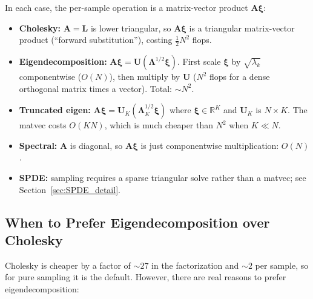 \documentclass[11pt]{article}
\newcommand{\R}{\mathbb{R}}
\newcommand{\bL}{\mathbf{L}}
\newcommand{\bU}{\mathbf{U}}
\newcommand{\bA}{\mathbf{A}}
\newcommand{\bxi}{\boldsymbol{\xi}}
\newcommand{\bLambda}{\boldsymbol{\Lambda}}
\begin{document}
\medskip
In each case, the per-sample operation is a matrix-vector product $\bA\bxi$:
\begin{itemize}[nosep]
  \item \textbf{Cholesky:} $\bA = \bL$ is lower triangular, so $\bA\bxi$ is a triangular matrix-vector product (``forward substitution''), costing $\frac{1}{2}N^2$ flops.
  \item \textbf{Eigendecomposition:} $\bA\bxi = \bU(\bLambda^{1/2}\bxi)$.  First scale $\bxi$ by $\sqrt{\lambda_k}$ componentwise ($O(N)$), then multiply by $\bU$ ($N^2$ flops for a dense orthogonal matrix times a vector).  Total: $\sim N^2$.
  \item \textbf{Truncated eigen:} $\bA\bxi = \bU_K(\bLambda_K^{1/2}\bxi)$ where $\bxi \in \R^K$ and $\bU_K$ is $N \times K$.  The matvec costs $O(KN)$, which is much cheaper than $N^2$ when $K \ll N$.
  \item \textbf{Spectral:} $\bA$ is diagonal, so $\bA\bxi$ is just componentwise multiplication: $O(N)$.
  \item \textbf{SPDE:} sampling requires a sparse triangular solve rather than a matvec; see Section~\ref{sec:SPDE_detail}.
\end{itemize}

\subsection{When to Prefer Eigendecomposition over Cholesky}\label{sec:eigen_vs_chol}

Cholesky is cheaper by a factor of $\sim 27$ in the factorization and $\sim 2$ per sample, so for pure sampling it is the default.  However, there are real reasons to prefer eigendecomposition:
\end{document}
